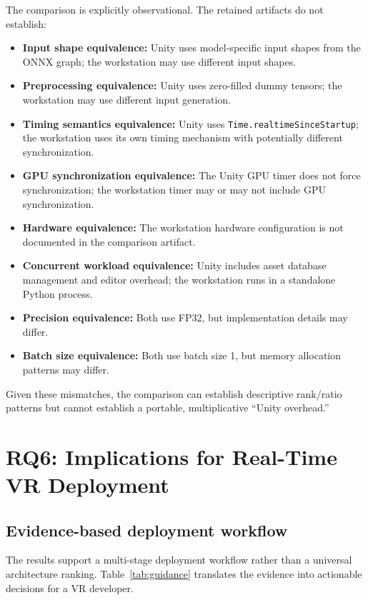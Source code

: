 \documentclass[10pt,twocolumn,letterpaper]{article}
\begin{document}
The comparison is explicitly observational. The retained artifacts do not establish:
\begin{itemize}[nosep,leftmargin=*]
  \item \textbf{Input shape equivalence:} Unity uses model-specific input shapes from the ONNX graph; the workstation may use different input shapes.
  \item \textbf{Preprocessing equivalence:} Unity uses zero-filled dummy tensors; the workstation may use different input generation.
  \item \textbf{Timing semantics equivalence:} Unity uses \texttt{Time.realtimeSinceStartup}; the workstation uses its own timing mechanism with potentially different synchronization.
  \item \textbf{GPU synchronization equivalence:} The Unity GPU timer does not force synchronization; the workstation timer may or may not include GPU synchronization.
  \item \textbf{Hardware equivalence:} The workstation hardware configuration is not documented in the comparison artifact.
  \item \textbf{Concurrent workload equivalence:} Unity includes asset database management and editor overhead; the workstation runs in a standalone Python process.
  \item \textbf{Precision equivalence:} Both use FP32, but implementation details may differ.
  \item \textbf{Batch size equivalence:} Both use batch size 1, but memory allocation patterns may differ.
\end{itemize}

Given these mismatches, the comparison can establish descriptive rank/ratio patterns but cannot establish a portable, multiplicative ``Unity overhead.''

\section{RQ6: Implications for Real-Time VR Deployment}\label{sec:rq6}

\subsection{Evidence-based deployment workflow}

The results support a multi-stage deployment workflow rather than a universal architecture ranking. Table~\ref{tab:guidance} translates the evidence into actionable decisions for a VR developer.
\end{document}
